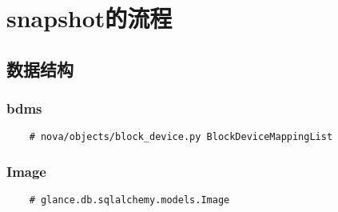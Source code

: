 \documentclass[a4paper,left=1.5cm,right=1.5cm,11pt]{article}
\begin{document}
\tableofcontents

\clearpage

\section{snapshot的流程}
\subsection{数据结构}

\subsubsection{bdms}
    \begin{lstlisting}
    # nova/objects/block_device.py BlockDeviceMappingList
    \end{lstlisting}

\subsubsection{Image}
    \begin{lstlisting}
    # glance.db.sqlalchemy.models.Image
    \end{lstlisting}

\clearpage
\end{document}

